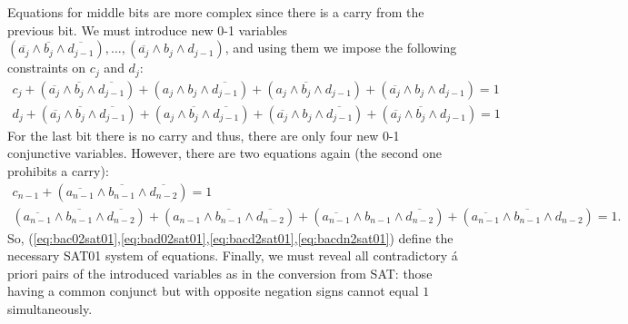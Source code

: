 \documentclass[11pt]{article}
\begin{document}
Equations for middle bits are more complex since there is a carry from the previous bit. We must introduce new 0-1 variables $(\overline{a_j} \land \overline{b_j} \land \overline{d_{j-1}}), \ldots, (\overline{a_j} \land b_j \land d_{j-1})$, and using them we impose the following constraints on $c_j$ and $d_j$:
\begin{equation}
\label{eq:bacd2sat01}
\begin{array}{c}
c_j + (\overline{a_j} \land \overline{b_j} \land \overline{d_{j-1}}) + (a_j \land b_j \land \overline{d_{j-1}}) + (a_j \land \overline{b_j} \land d_{j-1}) + (\overline{a_j} \land b_j \land d_{j-1}) =1 \\
d_j + (\overline{a_j} \land \overline{b_j} \land \overline{d_{j-1}}) + (a_j \land \overline{b_j} \land \overline{d_{j-1}}) + (\overline{a_j} \land b_j \land \overline{d_{j-1}}) + (\overline{a_j} \land \overline{b_j} \land d_{j-1}) =1
\end{array}
\end{equation}
For the last bit there is no carry and thus, there are only four new 0-1 conjunctive variables. However, there are two equations again (the second one prohibits a carry):
\begin{equation}
\label{eq:bacdn2sat01}
\begin{array}{c}
c_{n-1} + (\overline{a_{n-1}} \land \overline{b_{n-1}} \land \overline{d_{n-2}}) =1 \\
(\overline{a_{n-1}} \land \overline{b_{n-1}} \land \overline{d_{n-2}}) + (a_{n-1} \land \overline{b_{n-1}} \land \overline{d_{n-2}}) + (\overline{a_{n-1}} \land b_{n-1} \land \overline{d_{n-2}}) + (\overline{a_{n-1}} \land \overline{b_{n-1}} \land d_{n-2}) =1.
\end{array}
\end{equation}
So, (\ref{eq:bac02sat01},\ref{eq:bad02sat01},\ref{eq:bacd2sat01},\ref{eq:bacdn2sat01}) define the necessary SAT01 system of equations. Finally, we must reveal all contradictory \'a priori pairs of the introduced variables as in the conversion from SAT: those having a common conjunct but with opposite negation signs cannot equal $1$ simultaneously.
\end{document}
